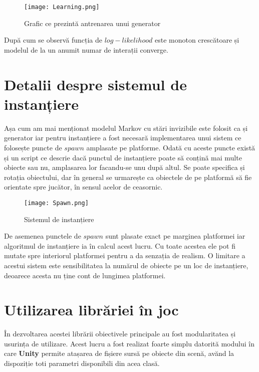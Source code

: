 \vspace{10mm}
\begin{figure}[H]
\centering
\texttt{[image: Learning.png]} \par
\caption{Grafic ce prezintă antrenarea unui generator}
\end{figure}

După cum se observă funcția de $log-likelihood$ este monoton crescătoare și modelul de la un anumit numar de interații converge.\par

\section{Detalii despre sistemul de instanțiere}

Așa cum am mai menționat modelul Markov cu stări invizibile este folosit ca și generator iar pentru instanțiere a fost necesară implementarea unui sistem ce folosește puncte de $spawn$ amplasate pe platforme. Odată cu aceste puncte există și un script ce descrie dacă punctul de instanțiere poate să conțină mai multe obiecte sau nu, amplasarea lor facandu-se unu după altul. Se poate specifica și rotația obiectului, dar în general se urmarește ca obiectele de pe platformă să fie orientate spre jucător, în sensul acelor de ceasornic.\par

\vspace{10mm}
\begin{figure}[H]
\centering
\texttt{[image: Spawn.png]} \par
\caption{Sistemul de instanțiere}
\end{figure}

De asemenea punctele de $spawn$ sunt plasate exact pe marginea platformei iar algoritmul de instanțiere ia în calcul acest lucru. Cu toate acestea ele pot fi mutate spre interiorul platformei pentru a da senzația de realism. O limitare a acestui sistem este sensibilitatea la numărul de obiecte pe un loc de instanțiere, deoarece acesta nu ține cont de lungimea platformei.\par

\section{Utilizarea librăriei în joc}

În dezvoltarea acestei librării obiectivele principale au fost modularitatea și usurința de utilizare. Acest lucru a fost realizat foarte simplu datorită modului în care \textbf{Unity} permite atașarea de fișiere sursă pe obiecte din scenă, avănd la dispoziție toti parametri disponibili din acea clasă.\par

